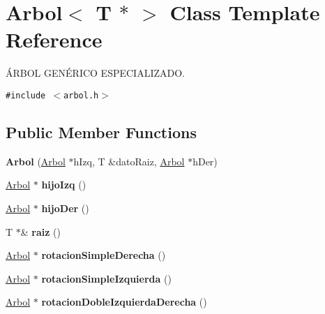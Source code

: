 \hypertarget{classArbol_3_01T_01_5_01_4}{
\section{Arbol$<$ T $\ast$ $>$ Class Template Reference}
\label{classArbol_3_01T_01_5_01_4}
}
ÁRBOL GENÉRICO ESPECIALIZADO.  


{\tt \#include $<$arbol.h$>$}

\subsection*{Public Member Functions}
\begin{CompactItemize}
\item 
\hypertarget{classArbol_3_01T_01_5_01_4_8dd7de29b0ab4a09f83f68859adab1c2}{
\textbf{Arbol} (\hyperlink{classArbol}{Arbol} $\ast$hIzq, T \&datoRaiz, \hyperlink{classArbol}{Arbol} $\ast$hDer)}
\label{classArbol_3_01T_01_5_01_4_8dd7de29b0ab4a09f83f68859adab1c2}

\item 
\hypertarget{classArbol_3_01T_01_5_01_4_749a2d379766355639cfb54b53b380e0}{
\hyperlink{classArbol}{Arbol} $\ast$ \textbf{hijoIzq} ()}
\label{classArbol_3_01T_01_5_01_4_749a2d379766355639cfb54b53b380e0}

\item 
\hypertarget{classArbol_3_01T_01_5_01_4_08b978b7673342fdefd10305ecf9e051}{
\hyperlink{classArbol}{Arbol} $\ast$ \textbf{hijoDer} ()}
\label{classArbol_3_01T_01_5_01_4_08b978b7673342fdefd10305ecf9e051}

\item 
\hypertarget{classArbol_3_01T_01_5_01_4_8934d183d51b81e002da3f36bd4ccda2}{
T $\ast$\& \textbf{raiz} ()}
\label{classArbol_3_01T_01_5_01_4_8934d183d51b81e002da3f36bd4ccda2}

\item 
\hypertarget{classArbol_3_01T_01_5_01_4_2ab377d8d55cf33ef48fc3d26bfaa4b3}{
\hyperlink{classArbol}{Arbol} $\ast$ \textbf{rotacionSimpleDerecha} ()}
\label{classArbol_3_01T_01_5_01_4_2ab377d8d55cf33ef48fc3d26bfaa4b3}

\item 
\hypertarget{classArbol_3_01T_01_5_01_4_5ff0886aeafe2be9575ed22b23428fad}{
\hyperlink{classArbol}{Arbol} $\ast$ \textbf{rotacionSimpleIzquierda} ()}
\label{classArbol_3_01T_01_5_01_4_5ff0886aeafe2be9575ed22b23428fad}

\item 
\hypertarget{classArbol_3_01T_01_5_01_4_aeb74ef9c3bd4120c4259c5801969c19}{
\hyperlink{classArbol}{Arbol} $\ast$ \textbf{rotacionDobleIzquierdaDerecha} ()}
\label{classArbol_3_01T_01_5_01_4_aeb74ef9c3bd4120c4259c5801969c19}


\end{CompactItemize}
